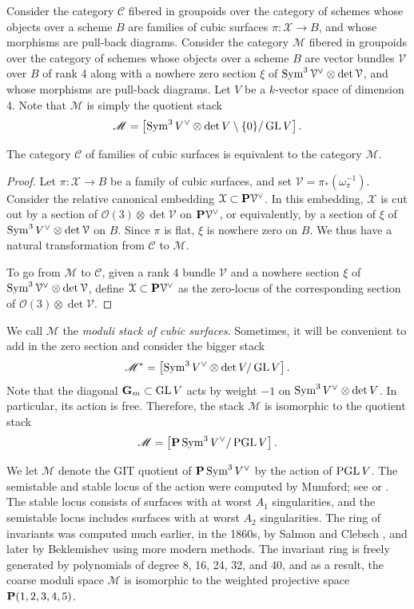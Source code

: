 \documentclass[12pt,reqno]{amsart}
\renewcommand{\k}{k}
\renewcommand{\to}{{\longrightarrow}}
\numberwithin{equation}{section}
\renewcommand{\O}{\mathcal O}
\newcommand{\G}{\mathbf G}
\newcommand{\cX}{\mathcal{X}}
\begin{document}
Consider the category $\mathscr {C}$ fibered in groupoids over the
category of schemes whose objects over a scheme $B$ are families of
cubic surfaces $\pi \colon \cX \to B$, and whose morphisms are pull-back
diagrams.  Consider the category $\mathscr {M}$ fibered in groupoids
over the category of schemes whose objects over a scheme $B$ are
vector bundles $\mathcal V$ over $B$ of rank 4 along with a nowhere
zero section $\xi$ of
$\Sym^3 \mathcal V^\vee \otimes \det \mathcal V$, and whose morphisms
are pull-back diagrams.  Let $V$ be a $\k$-vector space of dimension
4.  Note that $\mathscr{M}$ is simply the quotient stack
\[\mathscr{M} = \left[\Sym^3 V^\vee \otimes \det V \setminus \{0\} / \GL V \right]. \]
\begin{proposition}\label{prop:cubicstack}
  The category $\mathscr{C}$ of families of cubic surfaces is equivalent to the category $\mathscr{M}$.
\end{proposition}
\begin{proof}
  Let $\pi \colon \cX \to B$ be a family of cubic surfaces, and set
  $\mathcal V = \pi_* \left( \omega_{\pi}^{-1} \right)$.  Consider the
  relative canonical embedding $\cX \subset \P \mathcal V^\vee$.  In
  this embedding, $\cX$ is cut out by a section of
  $\O(3) \otimes \det \mathcal V$ on $\P \mathcal V^\vee$, or
  equivalently, by a section of $\xi$ of
  $\Sym^3V^\vee \otimes \det \mathcal V$ on $B$.  Since $\pi$ is flat,
  $\xi$ is nowhere zero on $B$.  We thus have a natural transformation
  from $\mathscr{C}$ to $\mathscr{M}$.

  To go from $\mathscr{M}$ to $\mathscr{C}$, given a rank 4 bundle $\mathcal V$ and a nowhere section $\xi$ of $\Sym^3 \mathcal V^\vee \otimes \det \mathcal V$, define $\cX \subset \P \mathcal V^\vee$ as the zero-locus of the corresponding section of $\O(3) \otimes \det \mathcal V$.
\end{proof}

We call $\mathscr{M}$ the \emph{moduli stack of cubic surfaces}.
Sometimes, it will be convenient to add in the zero section and consider the bigger stack
\[ \mathscr{M}^* = \left[\Sym^3 V^\vee \otimes \det V / \GL V \right].\]
Note that the diagonal $\G_m \subset \GL V$ acts by weight $-1$ on $\Sym^3 V^\vee \otimes \det V$.
In particular, its action is free.
Therefore, the stack $\mathscr{M}$ is isomorphic to the quotient stack
\[ \mathscr{M} = \left[ \P \Sym^3V^\vee / \PGL V \right].\]

We let $\mathcal M$ denote the GIT quotient of $\P \Sym^3V^\vee$ by
the action of $\PGL V$.  The semistable and stable locus of the
action were computed by Mumford; see \cite[Chapter 4, \S
2]{mum.fog.kir:94} or \cite[1.14]{mum:77}.  The stable locus consists
of surfaces with at worst $A_1$ singularities, and the semistable
locus includes surfaces with at worst $A_2$ singularities.  The ring
of invariants was computed much earlier, in the 1860s, by Salmon
\cite{sal:60} and Clebsch \cite{cle:61,cle:61*1}, and later by
Beklemishev \cite{bek:82} using more modern methods.  The invariant
ring is freely generated by polynomials of degree 8, 16, 24, 32, and
40, and as a result, the coarse moduli space $\mathcal M$ is
isomorphic to the weighted projective space $\P(1,2,3,4,5)$.
\end{document}

